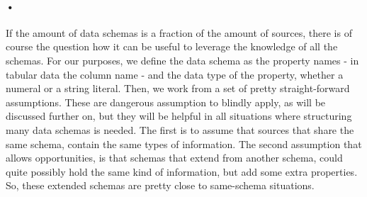 \documentclass[12pt,twoside,a4paper]{article}
\begin{document}
\paragraph{•}
If the amount of data schemas is a fraction of the amount of sources, there is of course the question how it can be useful to leverage the knowledge of all the schemas. 
For our purposes, we define the data schema as the property names - in tabular data the column name - and the data type of the property, whether a numeral or a string literal. 
Then, we work from a set of pretty straight-forward assumptions. 
These are dangerous assumption to blindly apply, as will be discussed further on, but they will be helpful in all situations where structuring many data schemas is needed. 
The first  is to assume that sources that share the same schema, contain the same types of information. 
The second assumption that allows opportunities, is that schemas that extend from another schema, could quite possibly hold the same kind of information, but add some extra properties. 
So, these extended schemas are pretty close to same-schema situations.


\end{document}
